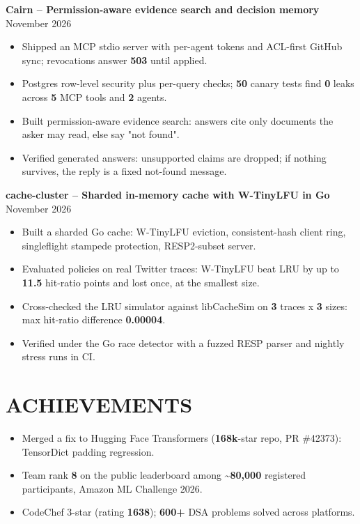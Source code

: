 \textbf{Cairn -- Permission-aware evidence search and decision memory}  \hfill November 2026\\
\begin{itemize}[leftmargin=1.4em,itemsep=1pt,topsep=2pt,parsep=0pt]
  \item Shipped an MCP stdio server with per-agent tokens and ACL-first GitHub sync; revocations answer \textbf{503} until applied.
  \item Postgres row-level security plus per-query checks; \textbf{50} canary tests find \textbf{0} leaks across \textbf{5} MCP tools and \textbf{2} agents.
  \item Built permission-aware evidence search: answers cite only documents the asker may read, else say "not found".
  \item Verified generated answers: unsupported claims are dropped; if nothing survives, the reply is a fixed not-found message.
\end{itemize}

\textbf{cache-cluster -- Sharded in-memory cache with W-TinyLFU in Go}  \hfill November 2026\\
\begin{itemize}[leftmargin=1.4em,itemsep=1pt,topsep=2pt,parsep=0pt]
  \item Built a sharded Go cache: W-TinyLFU eviction, consistent-hash client ring, singleflight stampede protection, RESP2-subset server.
  \item Evaluated policies on real Twitter traces: W-TinyLFU beat LRU by up to \textbf{11.5} hit-ratio points and lost once, at the smallest size.
  \item Cross-checked the LRU simulator against libCacheSim on \textbf{3} traces x \textbf{3} sizes: max hit-ratio difference \textbf{0.00004}.
  \item Verified under the Go race detector with a fuzzed RESP parser and nightly stress runs in CI.
\end{itemize}

\section*{ACHIEVEMENTS}
\begin{itemize}[leftmargin=1.4em,itemsep=1pt,topsep=2pt,parsep=0pt]
  \item Merged a fix to Hugging Face Transformers (\textbf{168k}-star repo, PR \#42373): TensorDict padding regression.
  \item Team rank \textbf{8} on the public leaderboard among \textasciitilde{}\textbf{80,000} registered participants, Amazon ML Challenge 2026.
  \item CodeChef 3-star (rating \textbf{1638}); \textbf{600+} DSA problems solved across platforms.
\end{itemize}

